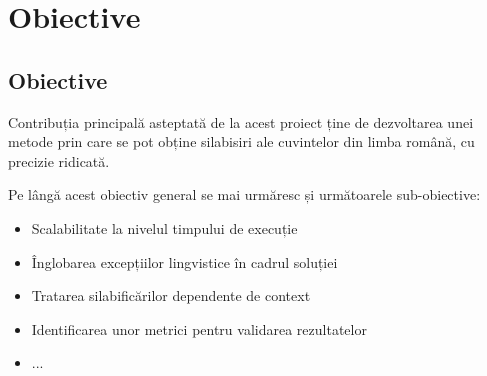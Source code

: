 \chapter{Obiective}
\label{cap:obiective-specificatii}
\section{Obiective}
Contribuția principală asteptată de la acest proiect ține de dezvoltarea unei metode prin care se pot obține silabisiri ale cuvintelor din limba română, cu precizie ridicată. 

Pe lângă acest obiectiv general se mai urmăresc și următoarele sub-obiective: 

\begin{itemize}
\item Scalabilitate la nivelul timpului de execuție
\item Înglobarea excepțiilor lingvistice în cadrul soluției
\item Tratarea silabificărilor dependente de context
\item Identificarea unor metrici pentru validarea rezultatelor
\item ... 
\end{itemize}
